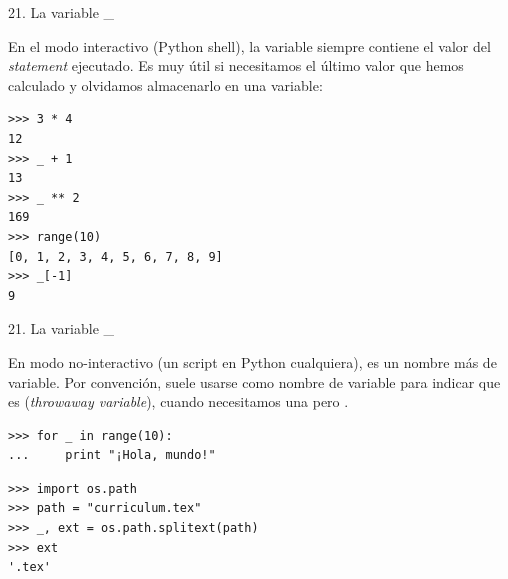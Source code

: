 \documentclass[14pt]{beamer}
\begin{document}
\begin{frame}[fragile]{21. La variable \_}
  \begin{alertblock}{}
    \small
    \centering
    En el modo interactivo (Python shell), la variable \structure{\_}
    siempre contiene el valor del  \emph{statement}
    ejecutado. Es muy útil si necesitamos  el último
    valor que hemos calculado y olvidamos almacenarlo en una variable:
  \end{alertblock}

  \footnotesize
  \begin{exampleblock}{}
    \begin{lstlisting}
>>> 3 * 4
12
>>> _ + 1
13
>>> _ ** 2
169
>>> range(10)
[0, 1, 2, 3, 4, 5, 6, 7, 8, 9]
>>> _[-1]
9
    \end{lstlisting}
  \end{exampleblock}
\end{frame}

\begin{frame}[fragile]{21. La variable \_}
  \begin{block}{}
    \small
    \centering
    En modo no-interactivo (un script en Python cualquiera),
    \structure{\_} es un nombre más de variable. Por convención, suele
    usarse como nombre de variable para indicar que es
     (\emph{throwaway variable}), cuando
    necesitamos una pero .
  \end{block}

  \footnotesize
  \begin{exampleblock}{}
    \begin{lstlisting}
>>> for _ in range(10):
...     print "¡Hola, mundo!"
    \end{lstlisting}
  \end{exampleblock}


  \begin{exampleblock}{}
    \begin{lstlisting}
>>> import os.path
>>> path = "curriculum.tex"
>>> _, ext = os.path.splitext(path)
>>> ext
'.tex'
    \end{lstlisting}
  \end{exampleblock}
\end{frame}
\end{document}
